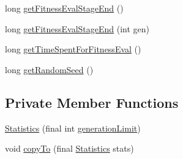 \begin{DoxyCompactItemize}
\item 
long \hyperlink{classjenes_1_1_genetic_algorithm_3_01_t_01extends_01_chromosome_01_4_1_1_statistics_ad6d6ce1f0dbf1c8ac76b3a0f10fbb568}{get\-Fitness\-Eval\-Stage\-End} ()
\item 
long \hyperlink{classjenes_1_1_genetic_algorithm_3_01_t_01extends_01_chromosome_01_4_1_1_statistics_a2c965bb1edac7e0c1d36806e236a5913}{get\-Fitness\-Eval\-Stage\-End} (int gen)
\item 
long \hyperlink{classjenes_1_1_genetic_algorithm_3_01_t_01extends_01_chromosome_01_4_1_1_statistics_afe3c71ced030b33863e7f071a4020dd6}{get\-Time\-Spent\-For\-Fitness\-Eval} ()
\item 
long \hyperlink{classjenes_1_1_genetic_algorithm_3_01_t_01extends_01_chromosome_01_4_1_1_statistics_a90b0186755df2626b6cd1a1dd9fbaa91}{get\-Random\-Seed} ()
\end{DoxyCompactItemize}
\subsection*{Private Member Functions}
\begin{DoxyCompactItemize}
\item 
\hyperlink{classjenes_1_1_genetic_algorithm_3_01_t_01extends_01_chromosome_01_4_1_1_statistics_a82248dcf0c3ea20268f9b6faa5394d8e}{Statistics} (final int \hyperlink{classjenes_1_1_genetic_algorithm_3_01_t_01extends_01_chromosome_01_4_1_1_statistics_a6e78ef036596b8056591b8165f20fa76}{generation\-Limit})
\item 
void \hyperlink{classjenes_1_1_genetic_algorithm_3_01_t_01extends_01_chromosome_01_4_1_1_statistics_aa25edfbf2f05c383295ea475db003667}{copy\-To} (final \hyperlink{classjenes_1_1_genetic_algorithm_3_01_t_01extends_01_chromosome_01_4_1_1_statistics_a82248dcf0c3ea20268f9b6faa5394d8e}{Statistics} stats)
\end{DoxyCompactItemize}
